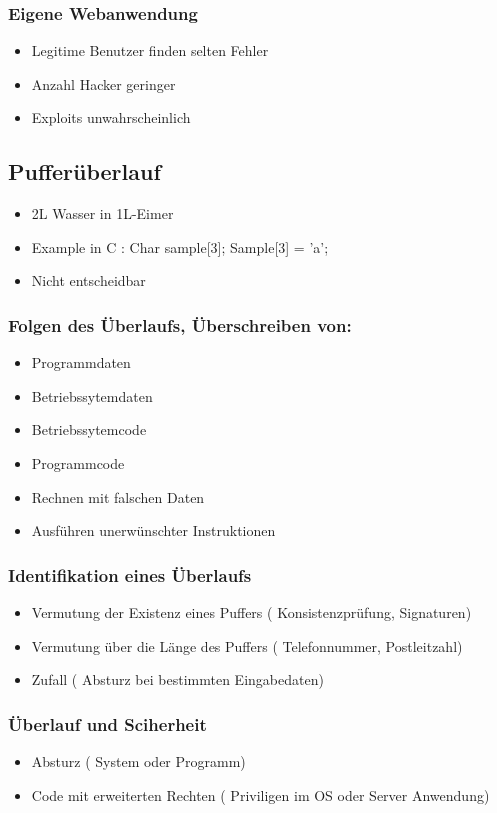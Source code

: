 \subsubsection*{Eigene Webanwendung}
\begin{itemize}
	\item Legitime Benutzer finden selten Fehler
	\item Anzahl Hacker geringer
	\item Exploits unwahrscheinlich
\end{itemize}


\subsection*{ Pufferüberlauf}
\begin{itemize}
	\item 2L Wasser in 1L-Eimer
	\item Example in C : 	Char sample[3]; Sample[3] = 'a';
	\item Nicht entscheidbar
\end{itemize}
\subsubsection*{Folgen des Überlaufs, Überschreiben von:}
\begin{itemize}
	\item Programmdaten
	\item Betriebssytemdaten
	\item Betriebssytemcode
	\item Programmcode
	\item Rechnen mit falschen Daten
	\item Ausführen unerwünschter Instruktionen
\end{itemize}

\subsubsection*{Identifikation eines Überlaufs}
\begin{itemize}
	\item Vermutung der Existenz eines Puffers ( Konsistenzprüfung, Signaturen)
	\item Vermutung über die Länge des Puffers ( Telefonnummer, Postleitzahl)
	\item Zufall ( Absturz bei bestimmten Eingabedaten)
\end{itemize}

\subsubsection*{Überlauf und Sciherheit }
\begin{itemize}
	\item Absturz ( System oder Programm)
	\item Code mit erweiterten Rechten ( Priviligen im OS oder Server Anwendung)
\end{itemize}

